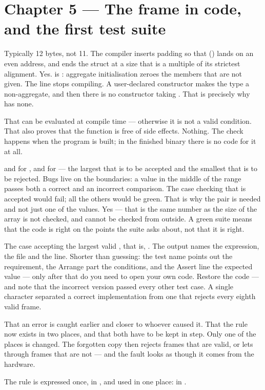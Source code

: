 \section*{Chapter 5 --- The frame in code, and the first test suite}

 Typically 12 bytes, not 11. The compiler inserts padding so that 
() lands on an even address, and ends the struct at a size that is a multiple
of its strictest alignment.
 Yes.  is : aggregate initialisation zeroes the members that are
not given.
 The line stops compiling. A user-declared constructor makes the type a non-aggregate, and
then there is no constructor taking . That is precisely why 
has none.

 That  can be evaluated at compile time --- otherwise it is not a valid
 condition. That also proves that the function is free of side effects.
 Nothing. The check happens when the program is built; in the finished binary there is no
code for it at all.

  and  for ,  and  for  --- the
largest that is to be accepted and the smallest that is to be rejected. Bugs live on the
boundaries: a value in the middle of the range passes both a correct and an incorrect comparison.
 The case checking that  is accepted would fail; all the others would be
green. That is why the pair is needed and not just one of the values.
 Yes --- that  is the same number as the size of the array is not checked,
and cannot be checked from outside. A green suite means that the code is right on the points the
suite asks about, not that it is right.

 The case accepting the largest valid , that is, . The output names
the expression, the file and the line.
 Shorter than guessing: the test name points out the requirement, the Arrange part the
conditions, and the Assert line the expected value --- only after that do you need to open your own
code.
 Restore the code --- and note that the incorrect version passed every other test case. A
single character separated a correct implementation from one that rejects every eighth valid
frame.

 That an error is caught earlier and closer to whoever caused it.
 That the rule now exists in two places, and that both have to be kept in step.
 Only one of the places is changed. The forgotten copy then rejects frames that are valid,
or lets through frames that are not --- and the fault looks as though it comes from the hardware.

The rule is expressed once, in , and used in one place: in .
